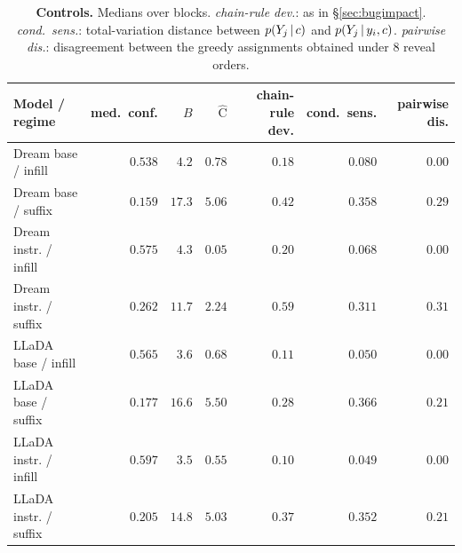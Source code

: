 \begin{table}[!ht]
\centering
\footnotesize
\setlength{\tabcolsep}{5pt}
\begin{tabular}{lrrrrrr}
\toprule
Model / regime & med.\ conf. & $B$ & $\widehat{\mathrm{C}}$ & chain-rule dev. & cond.\ sens. & pairwise dis. \\
\midrule
Dream base / infill & $0.538$ & $4.2$ & $0.78$ & $0.18$ & $0.080$ & $0.00$ \\
Dream base / suffix & $0.159$ & $17.3$ & $5.06$ & $0.42$ & $0.358$ & $0.29$ \\
Dream instr. / infill & $0.575$ & $4.3$ & $0.05$ & $0.20$ & $0.068$ & $0.00$ \\
Dream instr. / suffix & $0.262$ & $11.7$ & $2.24$ & $0.59$ & $0.311$ & $0.31$ \\
LLaDA base / infill & $0.565$ & $3.6$ & $0.68$ & $0.11$ & $0.050$ & $0.00$ \\
LLaDA base / suffix & $0.177$ & $16.6$ & $5.50$ & $0.28$ & $0.366$ & $0.21$ \\
LLaDA instr. / infill & $0.597$ & $3.5$ & $0.55$ & $0.10$ & $0.049$ & $0.00$ \\
LLaDA instr. / suffix & $0.205$ & $14.8$ & $5.03$ & $0.37$ & $0.352$ & $0.21$ \\
\bottomrule
\end{tabular}
\caption{\textbf{Controls.} Medians over blocks.
\emph{chain-rule dev.}: as in \S\ref{sec:bugimpact}. \emph{cond.\ sens.}: total-variation
distance between $p(Y_j\,\vert\, c)$ and $p(Y_j\,\vert\, y_i,c)$. \emph{pairwise dis.}:
disagreement between the greedy assignments obtained under $8$ reveal orders.}
\label{tab:controls}
\end{table}
